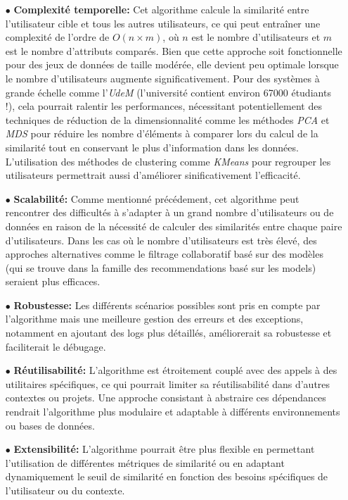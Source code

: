 \documentclass[11pt]{article}
\begin{document}
\begin{itemize}
	\item[$\bullet$] \textbf{Complexité temporelle:} Cet algorithme calcule la similarité entre l'utilisateur cible et tous les autres utilisateurs, ce qui peut entraîner une complexité de l'ordre de $O(n \times m)$, où $n$ est le nombre d'utilisateurs et $m$ est le nombre d'attributs comparés. Bien que cette approche soit fonctionnelle pour des jeux de données de taille modérée, elle devient peu optimale lorsque le nombre d'utilisateurs augmente significativement. Pour des systèmes à grande échelle comme l'\textit{UdeM} (l'université contient environ 67000 étudiants !), cela pourrait ralentir les performances, nécessitant potentiellement des techniques de réduction de la dimensionnalité comme les méthodes \textit{PCA} et \textit{MDS} pour réduire les nombre d'éléments à comparer lors du calcul de la similarité tout en conservant le plus d'information dans les données. L'utilisation des méthodes de clustering comme \textit{KMeans} pour regrouper les utilisateurs permettrait aussi d'améliorer sinificativement l'efficacité.\\
	
	\item[$\bullet$] \textbf{Scalabilité:} Comme mentionné précédement, cet algorithme peut rencontrer des difficultés à s'adapter à un grand nombre d'utilisateurs ou de données en raison de la nécessité de calculer des similarités entre chaque paire d'utilisateurs. Dans les cas où le nombre d'utilisateurs est très élevé, des approches alternatives comme le filtrage collaboratif basé sur des modèles (qui se trouve dans la famille des recommendations basé sur les models) seraient plus efficaces.\\
	
	\item[$\bullet$] \textbf{Robustesse:} Les différents scénarios possibles sont pris en compte par l'algorithme mais une meilleure gestion des erreurs et des exceptions, notamment en ajoutant des logs plus détaillés, améliorerait sa robustesse et faciliterait le débugage.\\
	
	\item[$\bullet$] \textbf{Réutilisabilité:} L'algorithme est étroitement couplé avec des appels à des utilitaires spécifiques, ce qui pourrait limiter sa réutilisabilité dans d'autres contextes ou projets. Une approche consistant à abstraire ces dépendances rendrait l'algorithme plus modulaire et adaptable à différents environnements ou bases de données.\\
	
	\item[$\bullet$] \textbf{Extensibilité:} L'algorithme pourrait être plus flexible en permettant l'utilisation de différentes métriques de similarité ou en adaptant dynamiquement le seuil de similarité en fonction des besoins spécifiques de l'utilisateur ou du contexte.\\
	
\end{itemize}
\end{document}
